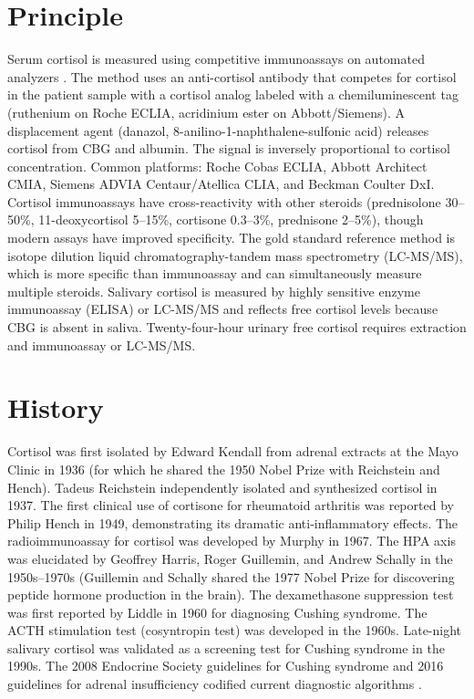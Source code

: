 \section*{Principle}
Serum cortisol is measured using competitive immunoassays on automated analyzers \cite{rifai2018tietz}. The method uses an anti-cortisol antibody that competes for cortisol in the patient sample with a cortisol analog labeled with a chemiluminescent tag (ruthenium on Roche ECLIA, acridinium ester on Abbott/Siemens). A displacement agent (danazol, 8-anilino-1-naphthalene-sulfonic acid) releases cortisol from CBG and albumin. The signal is inversely proportional to cortisol concentration. Common platforms: Roche Cobas ECLIA, Abbott Architect CMIA, Siemens ADVIA Centaur/Atellica CLIA, and Beckman Coulter DxI. Cortisol immunoassays have cross-reactivity with other steroids (prednisolone 30--50\%, 11-deoxycortisol 5--15\%, cortisone 0.3--3\%, prednisone 2--5\%), though modern assays have improved specificity. The gold standard reference method is isotope dilution liquid chromatography-tandem mass spectrometry (LC-MS/MS), which is more specific than immunoassay and can simultaneously measure multiple steroids. Salivary cortisol is measured by highly sensitive enzyme immunoassay (ELISA) or LC-MS/MS and reflects free cortisol levels because CBG is absent in saliva. Twenty-four-hour urinary free cortisol requires extraction and immunoassay or LC-MS/MS.

\section*{History}
Cortisol was first isolated by Edward Kendall from adrenal extracts at the Mayo Clinic in 1936 (for which he shared the 1950 Nobel Prize with Reichstein and Hench). Tadeus Reichstein independently isolated and synthesized cortisol in 1937. The first clinical use of cortisone for rheumatoid arthritis was reported by Philip Hench in 1949, demonstrating its dramatic anti-inflammatory effects. The radioimmunoassay for cortisol was developed by Murphy in 1967. The HPA axis was elucidated by Geoffrey Harris, Roger Guillemin, and Andrew Schally in the 1950s--1970s (Guillemin and Schally shared the 1977 Nobel Prize for discovering peptide hormone production in the brain). The dexamethasone suppression test was first reported by Liddle in 1960 for diagnosing Cushing syndrome. The ACTH stimulation test (cosyntropin test) was developed in the 1960s. Late-night salivary cortisol was validated as a screening test for Cushing syndrome in the 1990s. The 2008 Endocrine Society guidelines for Cushing syndrome and 2016 guidelines for adrenal insufficiency codified current diagnostic algorithms \cite{bornstein2016diagnosis}.

